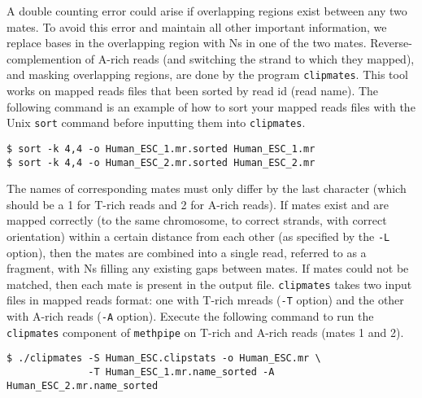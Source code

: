 \documentclass[10pt]{article}
\newcommand{\meth}{\texttt{methpipe}}
\newcommand{\prog}[1]{\texttt{#1}}
\newcommand{\op}[1]{\texttt{#1}}
\begin{document}
A double counting error could arise if overlapping regions exist
between any two mates. To avoid this error and maintain all other
important information, we replace bases in the overlapping region with
Ns in one of the two mates. Reverse-complemention of A-rich reads (and
switching the strand to which they mapped), and masking overlapping
regions, are done by the program \prog{clipmates}. This tool works on
mapped reads files that been sorted by read id (read name). The
following command is an example of how to sort your mapped reads files
with the Unix \prog{sort} command before inputting them into
\prog{clipmates}.
\begin{verbatim}
$ sort -k 4,4 -o Human_ESC_1.mr.sorted Human_ESC_1.mr
$ sort -k 4,4 -o Human_ESC_2.mr.sorted Human_ESC_2.mr
\end{verbatim}
The names of corresponding mates must only differ by the last
character (which should be a 1 for T-rich reads and 2 for A-rich
reads). If mates exist and are mapped correctly (to the same
chromosome, to correct strands, with correct orientation) within a
certain distance from each other (as specified by the \op{-L} option),
then the mates are combined into a single read, referred to as a
fragment, with Ns filling any existing gaps between mates. If mates
could not be matched, then each mate is present in the output
file. \prog{clipmates} takes two input files in mapped reads format:
one with T-rich mreads (\op{-T} option) and the other with A-rich
reads (\op{-A} option). Execute the following command to run the
\prog{clipmates} component of \meth{} on T-rich and A-rich reads
(mates 1 and 2).
\begin{verbatim}
$ ./clipmates -S Human_ESC.clipstats -o Human_ESC.mr \
              -T Human_ESC_1.mr.name_sorted -A Human_ESC_2.mr.name_sorted
\end{verbatim}

\end{document}
